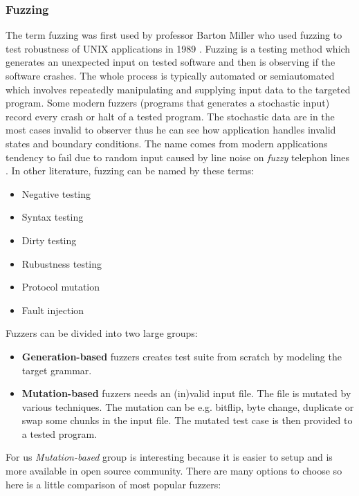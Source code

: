 \subsubsection{Fuzzing}
\label{fuzzing}
The term fuzzing was first used by professor Barton Miller who used fuzzing to
test robustness of UNIX applications in 1989 \cite{Takanen:2008:FSS:1404500,
Marhefka2013}. Fuzzing is a testing method which generates an unexpected input
on tested software and then is observing if the software crashes. The whole
process is typically automated or semiautomated which involves repeatedly
manipulating and supplying input data to the targeted program. Some modern
fuzzers (programs that generates a stochastic input) record every crash or halt
of a tested program. The stochastic data are in the most cases invalid to
observer thus he can see how application handles invalid states and boundary
conditions. The name comes from modern applications tendency to fail due to
random input caused by line noise on \emph{fuzzy} telephon lines
\cite{Takanen:2008:FSS:1404500, N2LYDLnqzEFYp0wM, takanen2009fuzzing}. In other
literature, fuzzing can be named by these terms:
\begin{itemize}
	\item Negative testing
	\item Syntax testing
	\item Dirty testing
	\item Rubustness testing
	\item Protocol mutation
	\item Fault injection
\end{itemize}

\noindent
Fuzzers can be divided into two large groups:

\begin{itemize}
	\item \textbf{Generation-based} fuzzers creates test suite from scratch by modeling the target grammar.
	\item \textbf{Mutation-based} fuzzers needs an (in)valid input file. The file is mutated by various techniques.
	The mutation can be e.g. bitflip, byte change, duplicate or swap some chunks in the input file.
	The mutated test case is then provided to a tested program.
\end{itemize}

For us \emph{Mutation-based} group is interesting because it is easier to setup and
is more available in open source community. There are many options to choose so here is
a little comparison of most popular fuzzers:

